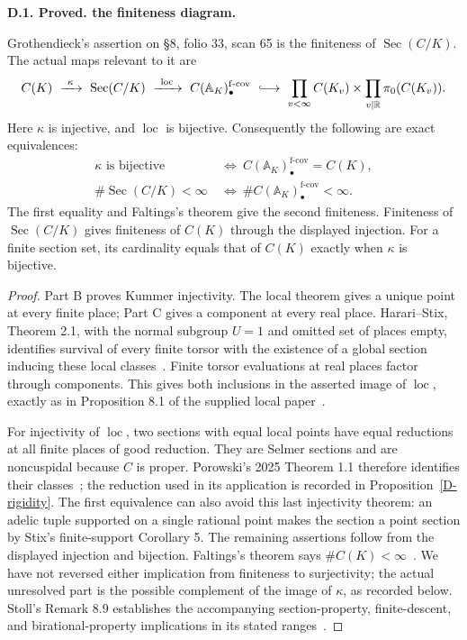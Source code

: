 \documentclass[11pt,oneside]{article}
\makeatletter
\newcounter{statementanchor}
\newenvironment{statement}[3]{%
 \refstepcounter{statementanchor}\def\@currentlabel{#1}%
 \par\addvspace{9pt}\noindent
 \textbf{#1. #2. #3.}\par\nobreak\noindent\ignorespaces
}{\par\addvspace{5pt}}
\makeatother
\begin{document}
\begin{statement}{D.1}{Proved}{the finiteness diagram}
\label{st:D.1}
\label{D-logical}
Grothendieck's assertion on \S8, folio 33, scan 65 is
the finiteness of $\operatorname{Sec}(C/K)$.
The actual maps relevant to it are
\[
 C(K)\ \xrightarrow{\ \kappa\ }\ \operatorname{Sec}(C/K)
 \ \xrightarrow{\ \operatorname{loc}\ }\
 C(\mathbb A_K)_\bullet^{\mathrm{f\text{-}cov}}
 \ \lhook\joinrel\longrightarrow\
 \prod_{v<\infty}C(K_v)\times
 \prod_{v\mid\mathbb R}\pi_0(C(K_v)).
\]
Here $\kappa$ is injective, and $\operatorname{loc}$
is bijective. Consequently the following are exact
equivalences:
\[
 \begin{split}
 \kappa\text{ is bijective}
 &\ \Longleftrightarrow\
 C(\mathbb A_K)_\bullet^{\mathrm{f\text{-}cov}}=C(K),\\
 \#\operatorname{Sec}(C/K)<\infty
 &\ \Longleftrightarrow\
 \#C(\mathbb A_K)_\bullet^{\mathrm{f\text{-}cov}}<\infty.
 \end{split}
\]
The first equality and Faltings's theorem give the second
finiteness. Finiteness of $\operatorname{Sec}(C/K)$ gives
finiteness of $C(K)$ through the displayed injection.
For a finite section set, its cardinality equals that
of $C(K)$ exactly when $\kappa$ is bijective.
\end{statement}
\begin{proof}
Part B proves Kummer injectivity. The local theorem gives
a unique point at every finite place; Part C gives a
component at every real place. Harari--Stix, Theorem 2.1,
with the normal subgroup $U=1$ and omitted set of places
empty, identifies survival of every finite torsor with
the existence of a global section inducing these local
classes~\cite{HarariStix2012}. Finite torsor evaluations
at real places factor through components. This gives
both inclusions in the asserted image of $\operatorname{loc}$,
exactly as in Proposition 8.1 of the supplied local
paper~\cite{B_OpenAIPadic}.

For injectivity of $\operatorname{loc}$, two sections
with equal local points have equal reductions at all
finite places of good reduction. They are Selmer
sections and are noncuspidal because $C$ is proper.
Porowski's 2025 Theorem 1.1 therefore identifies their
classes~\cite{Porowski2025}; the reduction used in its
application is recorded in Proposition~\ref{D-rigidity}.
The first equivalence can also avoid this last
injectivity theorem: an adelic tuple supported on a
single rational point makes the section a point
section by Stix's finite-support Corollary 5.
The remaining assertions follow from the displayed
injection and bijection. Faltings's theorem says
$\#C(K)<\infty$~\cite{Faltings1983}. We have not reversed
either implication from finiteness to surjectivity;
the actual unresolved part is the possible complement
of the image of $\kappa$, as recorded below.
Stoll's Remark 8.9 establishes the accompanying
section-property, finite-descent, and birational-property
implications in its stated ranges~\cite{Stoll2007}.
\end{proof}
\end{document}
